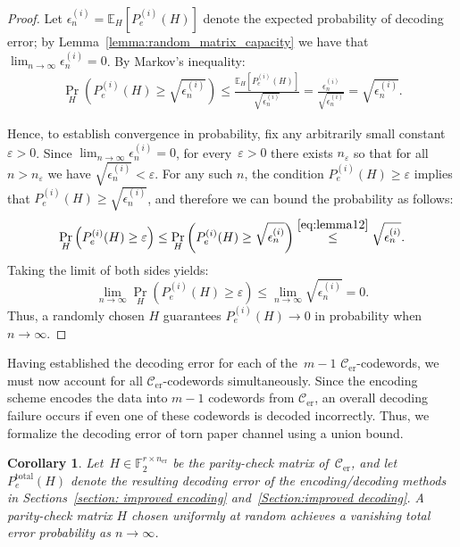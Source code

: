 \documentclass[journal,letterpaper,onecolumn,11pt]{IEEEtran}
\newcommand{\bF}{\mathbb{F}}
\newcommand{\cC}{\mathcal{C}}
\newtheorem{corollary}{Corollary}
\begin{document}
\begin{proof}
    Let $\epsilon_n^{(i)} = \mathbb{E}_H[P_e^{(i)}(H)]$ denote the expected probability of decoding error; by Lemma~\ref{lemma:random_matrix_capacity} we have that $\lim_{n \to \infty} \epsilon_n^{(i)} = 0$.    
    By Markov's inequality:
    \begin{align}\label{eq:lemma12}
        \Pr_H\left(P_e^{(i)}(H) \ge \sqrt{\epsilon_n^{(i)}}\right) \le \frac{\mathbb{E}_H[P_e^{(i)}(H)]}{\sqrt{\epsilon_n^{(i)}}}=\frac{\epsilon_n^{(i)}}{\sqrt{\epsilon_n^{(i)}}} = \sqrt{\epsilon_n^{(i)}}.
    \end{align}
     
    Hence, to establish convergence in probability, fix any arbitrarily small constant $\varepsilon > 0$.
    Since $\lim_{n\to\infty} \epsilon_n^{(i)} = 0$, for every~$\varepsilon>0$ there exists $n_\varepsilon$ so that for all $n > n_\varepsilon$ we have $\sqrt{\epsilon_n^{(i)}} < \varepsilon$.     
    For any such $n$, the condition $P_e^{(i)}(H) \ge \varepsilon$ implies that $P_e^{(i)}(H) \ge \sqrt{\epsilon_n^{(i)}}$, and therefore we can bound the probability as follows:
    $$ \Pr_H\left(P_e^{(i)}(H) \ge \varepsilon\right) \le \Pr_H\left(P_e^{(i)}(H) \ge \sqrt{\epsilon_n^{(i)}}\right) \overset{\eqref{eq:lemma12}}{\le} \sqrt{\epsilon_n^{(i)}}. $$
    Taking the limit of both sides yields:
    $$ \lim_{n \to \infty} \Pr_H\left(P_e^{(i)}(H) \ge \varepsilon\right) \le \lim_{n \to \infty} \sqrt{\epsilon_n^{(i)}} = 0. $$
    Thus, a randomly chosen $H$ guarantees $P_e^{(i)}(H)\to 0$ in probability when $n\to\infty$.
\end{proof}
Having established the decoding error for each of the~$m-1$ $\cC_\text{er}$-codewords, we must now account for all $\cC_\text{er}$-codewords simultaneously. 
Since the encoding scheme encodes the data into $m-1$ codewords from $\cC_\text{er}$, an overall decoding failure occurs if even one of these codewords is decoded incorrectly.
Thus, we formalize the decoding error of torn paper channel using a union bound.
\begin{corollary}\label{corollary:total_decoding_error}
    Let~$H\in\bF_2^{r\times n_\text{er}}$ be the parity-check matrix of~$\cC_\text{er}$, and let $P_e^{\text{total}}(H)$ denote the resulting decoding error of the encoding/decoding methods in Sections~\ref{section: improved encoding} and~\ref{Section:improved decoding}.
    A parity-check matrix $H$ chosen uniformly at random achieves a vanishing total error probability as $n \to \infty$.
\end{corollary}
\end{document}
